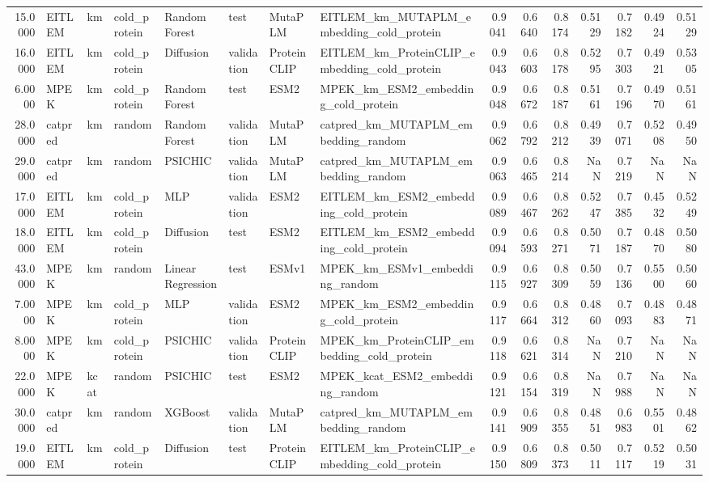 \begin{tabular}{rlllllllrrrrrrr}
15.0000 & EITLEM & km & cold_protein & Random Forest & test & MutaPLM & EITLEM_km_MUTAPLM_embedding_cold_protein & 0.9041 & 0.6640 & 0.8174 & 0.5129 & 0.7182 & 0.4924 & 0.5129 \\
16.0000 & EITLEM & km & cold_protein & Diffusion & validation & ProteinCLIP & EITLEM_km_ProteinCLIP_embedding_cold_protein & 0.9043 & 0.6603 & 0.8178 & 0.5295 & 0.7303 & 0.4921 & 0.5305 \\
6.0000 & MPEK & km & cold_protein & Random Forest & test & ESM2 & MPEK_km_ESM2_embedding_cold_protein & 0.9048 & 0.6672 & 0.8187 & 0.5161 & 0.7196 & 0.4970 & 0.5161 \\
28.0000 & catpred & km & random & Random Forest & validation & MutaPLM & catpred_km_MUTAPLM_embedding_random & 0.9062 & 0.6792 & 0.8212 & 0.4939 & 0.7071 & 0.5208 & 0.4950 \\
29.0000 & catpred & km & random & PSICHIC & validation & MutaPLM & catpred_km_MUTAPLM_embedding_random & 0.9063 & 0.6465 & 0.8214 & NaN & 0.7219 & NaN & NaN \\
17.0000 & EITLEM & km & cold_protein & MLP & validation & ESM2 & EITLEM_km_ESM2_embedding_cold_protein & 0.9089 & 0.6467 & 0.8262 & 0.5247 & 0.7385 & 0.4532 & 0.5249 \\
18.0000 & EITLEM & km & cold_protein & Diffusion & test & ESM2 & EITLEM_km_ESM2_embedding_cold_protein & 0.9094 & 0.6593 & 0.8271 & 0.5071 & 0.7187 & 0.4870 & 0.5080 \\
43.0000 & MPEK & km & random & Linear Regression & test & ESMv1 & MPEK_km_ESMv1_embedding_random & 0.9115 & 0.6927 & 0.8309 & 0.5059 & 0.7136 & 0.5500 & 0.5060 \\
7.0000 & MPEK & km & cold_protein & MLP & validation & ESM2 & MPEK_km_ESM2_embedding_cold_protein & 0.9117 & 0.6664 & 0.8312 & 0.4860 & 0.7093 & 0.4883 & 0.4871 \\
8.0000 & MPEK & km & cold_protein & PSICHIC & validation & ProteinCLIP & MPEK_km_ProteinCLIP_embedding_cold_protein & 0.9118 & 0.6621 & 0.8314 & NaN & 0.7210 & NaN & NaN \\
22.0000 & MPEK & kcat & random & PSICHIC & test & ESM2 & MPEK_kcat_ESM2_embedding_random & 0.9121 & 0.6154 & 0.8319 & NaN & 0.7988 & NaN & NaN \\
30.0000 & catpred & km & random & XGBoost & validation & MutaPLM & catpred_km_MUTAPLM_embedding_random & 0.9141 & 0.6909 & 0.8355 & 0.4851 & 0.6983 & 0.5501 & 0.4862 \\
19.0000 & EITLEM & km & cold_protein & Diffusion & test & ProteinCLIP & EITLEM_km_ProteinCLIP_embedding_cold_protein & 0.9150 & 0.6809 & 0.8373 & 0.5011 & 0.7117 & 0.5219 & 0.5031 \\

\end{tabular}
